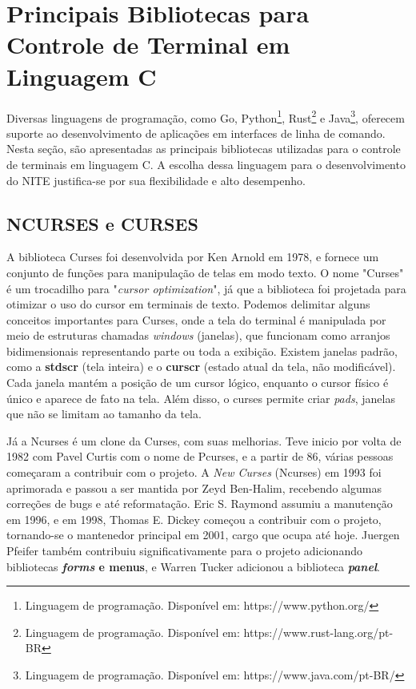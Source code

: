 \section{Principais Bibliotecas para Controle de Terminal em Linguagem C}

Diversas linguagens de programação, como Go, Python\footnote{Linguagem de
programação. Disponível em: https://www.python.org/}, Rust\footnote{Linguagem de
programação. Disponível em: https://www.rust-lang.org/pt-BR} e Java\footnote{Linguagem
de programação. Disponível em: https://www.java.com/pt-BR/}, oferecem suporte ao
desenvolvimento de aplicações em interfaces de linha de comando. Nesta seção,
são apresentadas as principais bibliotecas utilizadas para o controle de
terminais em linguagem C. A escolha dessa linguagem para o desenvolvimento do NITE
justifica-se por sua flexibilidade e alto desempenho.

\subsection{NCURSES e CURSES}

A biblioteca Curses foi desenvolvida por Ken Arnold em 1978, e fornece um conjunto
de funções para manipulação de telas em modo texto. O nome "Curses" é um
trocadilho para "\textit{cursor optimization}", já que a biblioteca foi
projetada para otimizar o uso do cursor em terminais de texto. Podemos delimitar
alguns conceitos importantes para Curses, onde a tela do terminal é manipulada
por meio de estruturas chamadas \textit{windows} (janelas), que funcionam como
arranjos bidimensionais representando parte ou toda a exibição. Existem janelas padrão,
como a \textbf{stdscr} (tela inteira) e o \textbf{curscr} (estado atual da tela,
não modificável). Cada janela mantém a posição de um cursor lógico, enquanto o cursor
físico é único e aparece de fato na tela. Além disso, o curses permite criar \textit{pads},
janelas que não se limitam ao tamanho da tela. \cite{ibm_curses_aix}

Já a Ncurses é um clone da Curses, com suas melhorias. Teve inicio por volta de 1982
com Pavel Curtis com o nome de Pcurses, e a partir de 86, várias pessoas começaram
a contribuir com o projeto. A \textit{New Curses} (Ncurses) em 1993 foi aprimorada
e passou a ser mantida por Zeyd Ben-Halim, recebendo algumas correções de bugs e
até reformatação. Eric S. Raymond assumiu a manutenção em 1996, e em 1998,
Thomas E. Dickey começou a contribuir com o projeto, tornando-se o mantenedor
principal em 2001, cargo que ocupa até hoje. Juergen Pfeifer também contribuiu
significativamente para o projeto adicionando bibliotecas \textbf{\textit{forms}
e menus}, e Warren Tucker adicionou a biblioteca \textbf{\textit{panel}}.
\cite{ncurses_site}

